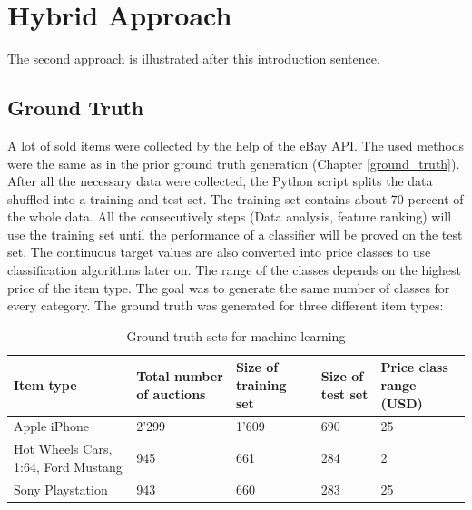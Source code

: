 \section{Hybrid Approach}
The second approach is illustrated after this introduction sentence.
\subsection{Ground Truth}
A lot of sold items were collected by the help of the eBay API. The used methods were the same as in the prior ground truth generation (Chapter \ref{ground_truth}). After all the necessary data were collected, the Python script splits the data shuffled into a training and test set. The training set contains about 70 percent of the whole data. All the consecutively steps (Data analysis, feature ranking) will use the training set until the performance of a classifier will be proved on the test set. The continuous target values are also converted into price classes to use classification algorithms later on. The range of the classes depends on the highest price of the item type. The goal was to generate the same number of classes for every category. The ground truth was generated for three different item types:
\begin{table}[h!]
	\begin{center}
	\begin{tabular}{| p{2.6cm} | p{2.6cm} | p{2.6cm} | p{2.6cm} | p{2.6cm} |}
		\hline
		\textbf{Item type} & \textbf{Total number of auctions} & \textbf{Size of training set} & \textbf{Size of test set} & \textbf{Price class range (USD)} \\
		\hline
		Apple iPhone & 2'299 & 1'609 & 690 & 25 \\
		\hline
		Hot Wheels Cars, 1:64, Ford Mustang & 945 & 661 & 284 & 2 \\
		\hline
		Sony Playstation & 943 & 660 & 283 & 25 \\
		\hline
	\end{tabular}
	\end{center}
	\caption{Ground truth sets for machine learning}
\end{table}
